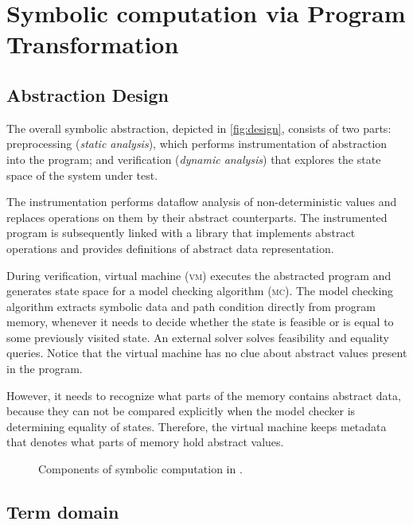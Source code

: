 \section{Symbolic computation via Program Transformation}
\label{sec:symbolic}

\subsection{Abstraction Design}

The overall symbolic abstraction, depicted in \autoref{fig:design}, consists of
two parts: preprocessing (\emph{static analysis}), which performs
instrumentation of abstraction into the program; and verification
(\emph{dynamic analysis}) that explores the state space of the system under
test.

The instrumentation performs dataflow analysis of non-de\-ter\-ministic values and
replaces operations on them by their abstract counterparts. The instrumented
program is subsequently linked with a library that implements abstract
operations and provides definitions of abstract data representation.

During verification, virtual machine (\textsc{vm}) executes the abs\-trac\-ted
program and generates state space for a model checking algorithm (\textsc{mc}).
The model checking algorithm extracts symbolic data and path condition directly
from program memory, whenever it needs to decide whether the state is feasible
or is equal to some previously visited state. An external \smt solver solves
feasibility and equality queries. Notice that the virtual machine has no clue
about abstract values present in the program.

However, it needs to recognize what parts of the memory contains abstract data,
because they can not be compared explicitly when the model checker is
determining equality of states. Therefore, the virtual machine keeps metadata that denotes what
parts of memory hold abstract values.

\begin{figure}
    \centering
    
    \caption{Components of symbolic computation in \divine.}
    \label{fig:design}
\end{figure}

\subsection{Term domain}

